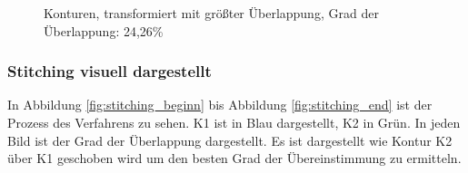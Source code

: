 \begin{figure}[h]
\begin{minipage}{0.49\textwidth}
        \caption{Konturen, transformiert mit größter Überlappung, 
        Grad der Überlappung: 24,26\%}
        \label{fig:after_matching}
    \end{minipage}\hfill
\end{figure}

\subsubsection*{Stitching visuell dargestellt}

In Abbildung \ref{fig:stitching_beginn} bis Abbildung \ref{fig:stitching_end}
ist der Prozess des Verfahrens zu sehen. K1 ist in Blau dargestellt, K2 in Grün.
In jeden Bild ist der Grad der Überlappung dargestellt. Es ist dargestellt wie 
Kontur K2 über K1 geschoben wird um den besten Grad der Übereinstimmung zu ermitteln. 


